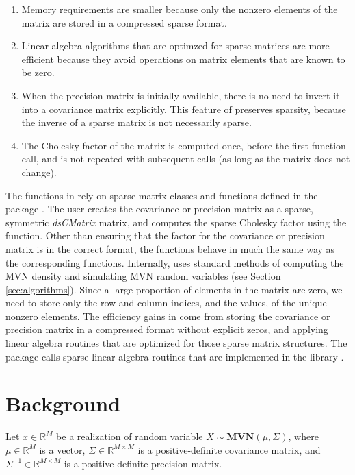 \documentclass[codesnippet]{jss}\usepackage[]{graphicx}\usepackage[]{color}
\newcommand{\func}[1]{\code{#1}}
\newcommand{\class}[1]{\textsl{#1}}
\newcommand{\MVN}[1]{\mathbf{MVN}\!\left(#1\right)}
\newcommand{\Real}[1]{\mathbb{R}^{#1}}
\begin{document}
\begin{enumerate}
\item Memory requirements are smaller because only the nonzero
  elements of the matrix are stored in a compressed sparse format.
\item Linear algebra algorithms that are optimzed for sparse matrices
  are more efficient because they avoid operations on matrix elements that are known to be zero.
\item When the precision matrix is initially available,
  there is no need to invert it into a covariance matrix explicitly.
  This feature of  preserves sparsity, because the inverse of a sparse matrix is
  not necessarily sparse.
\item The Cholesky factor of the matrix is computed once, before the
  first  function call, and is not repeated with subsequent calls
  (as long as the matrix does not change).
\end{enumerate}


The functions in  rely on sparse matrix classes and
functions defined in the  package
\citep{R_Matrix}.  The user creates the covariance or precision matrix
as a sparse, symmetric \class{dsCMatrix} matrix, and computes the
sparse Cholesky factor using the \func{Cholesky} function. Other than ensuring that
the factor for the covariance or precision matrix is in the correct
format, the  functions behave
in much the same way as the corresponding  functions.
Internally,  uses
standard methods of computing the MVN density and simulating MVN
random variables (see Section \ref{sec:algorithms}).  Since a large
proportion of elements in the matrix are zero, we need
to store only the row and column indices, and the values, of the
unique nonzero elements.  The efficiency gains in  come from
storing the covariance or precision matrix in a compressed format without
explicit zeros, and applying linear algebra routines that are
optimized for those sparse matrix structures.  The 
package calls sparse linear algebra routines that are implemented in
the  library
\citep{ChenDavis2008,DavisHager1999,DavisHager2009}.



\section{Background}
Let $x\in\Real{M}$ be a realization of random variable
$X\sim\MVN{\mu,\Sigma}$, where $\mu\in\Real{M}$ is a vector,
$\Sigma\in\Real{M\times M}$ is a positive-definite covariance matrix,
and $\Sigma^{-1}\in\Real{M\times M}$ is a positive-definite precision matrix.
\end{document}
